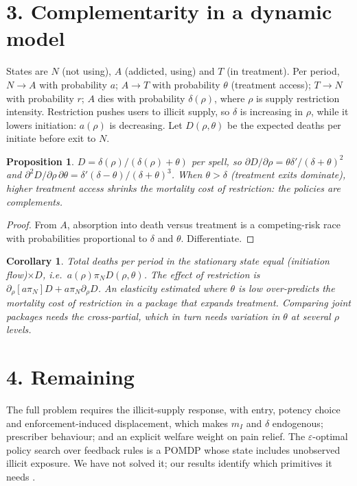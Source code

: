 \documentclass[11pt]{article}
\newtheorem{proposition}[theorem]{Proposition}
\newtheorem{corollary}[theorem]{Corollary}
\theoremstyle{definition}
\begin{document}
\section*{3. Complementarity in a dynamic model}
States are $N$ (not using), $A$ (addicted, using) and $T$ (in treatment). Per period, $N\to A$ with probability $a$;
$A\to T$ with probability $\theta$ (treatment access); $T\to N$ with probability $r$; $A$ dies with probability
$\delta(\rho)$, where $\rho$ is supply restriction intensity. Restriction pushes users to illicit supply, so $\delta$ is
increasing in $\rho$, while it lowers initiation: $a(\rho)$ is decreasing. Let $D(\rho,\theta)$ be the expected deaths per
initiate before exit to $N$.
\begin{proposition}\label{prop:comp}
$D=\delta(\rho)/(\delta(\rho)+\theta)$ per spell, so $\partial D/\partial\rho=\theta\delta'/(\delta+\theta)^2$ and
$\partial^2D/\partial\rho\,\partial\theta=\delta'(\delta-\theta)/(\delta+\theta)^3$. When $\theta>\delta$ (treatment
exits dominate), higher treatment access shrinks the mortality cost of restriction: the policies are complements.
\end{proposition}
\begin{proof}
From $A$, absorption into death versus treatment is a competing-risk race with probabilities proportional to $\delta$ and
$\theta$. Differentiate.
\end{proof}
\begin{corollary}
Total deaths per period in the stationary state equal (initiation flow)$\times D$, i.e.\ $a(\rho)\pi_N D(\rho,\theta)$. The
effect of restriction is $\partial_\rho[a\pi_N]D+a\pi_N\partial_\rho D$. An elasticity estimated where $\theta$ is low
over-predicts the mortality cost of restriction in a package that expands treatment. Comparing joint packages needs the
cross-partial, which in turn needs variation in $\theta$ at several $\rho$ levels.
\end{corollary}

\section*{4. Remaining}
The full problem requires the illicit-supply response, with entry, potency choice and enforcement-induced displacement,
which makes $m_I$ and $\delta$ endogenous; prescriber behaviour; and an explicit welfare weight on pain relief. The
$\varepsilon$-optimal policy search over feedback rules is a POMDP whose state includes unobserved illicit exposure. We
have not solved it; our results identify which primitives it needs \cite{bm,gk,app}.
\end{document}
